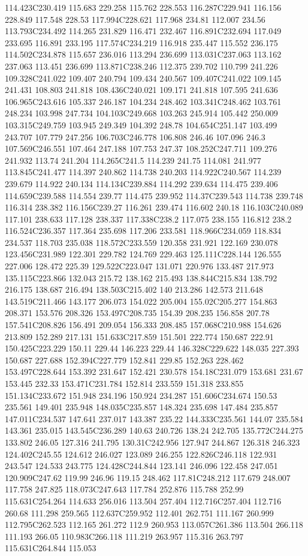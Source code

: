 114.423C230.419 115.683 229.258 115.762 228.553 116.287C229.941 116.156 228.849 117.548 228.53 117.994C228.621 117.968 234.81 112.007 234.56 113.793C234.492 114.265 231.829 116.471 232.467 116.891C232.694 117.049 233.695 116.891 233.195 117.574C234.219 116.918 235.447 115.552 236.175 114.502C234.878 115.657 236.016 113.294 236.699 113.031C237.063 113.162 237.063 113.451 236.699 113.871C238.246 112.375 239.702 110.799 241.226 109.328C241.022 109.407 240.794 109.434 240.567 109.407C241.022 109.145 241.431 108.803 241.818 108.436C240.021 109.171 241.818 107.595 241.636 106.965C243.616 105.337 246.187 104.234 248.462 103.341C248.462 103.761 248.234 103.998 247.734 104.103C249.668 103.263 245.914 105.442 250.009 103.315C249.759 103.945 249.349 104.392 248.78 104.654C251.147 103.499 243.707 107.779 247.256 106.703C246.778 106.808 246.46 107.096 246.3 107.569C246.551 107.464 247.188 107.753 247.37 108.252C247.711 109.276 241.932 113.74 241.204 114.265C241.5 114.239 241.75 114.081 241.977 113.845C241.477 114.397 240.862 114.738 240.203 114.922C240.567 114.239 239.679 114.922 240.134 114.134C239.884 114.292 239.634 114.475 239.406 114.659C239.588 114.554 239.77 114.475 239.952 114.37C239.543 114.738 239.748 116.314 238.382 116.156C239.27 116.261 239.474 116.602 240.18 116.103C240.089 117.101 238.633 117.128 238.337 117.338C238.2 117.075 238.155 116.812 238.2 116.524C236.357 117.364 235.698 117.206 233.581 118.966C234.059 118.834 234.537 118.703 235.038 118.572C233.559 120.358 231.921 122.169 230.078 123.456C231.989 122.301 229.782 124.769 229.463 125.111C228.144 126.555 227.006 128.472 225.39 129.522C223.047 131.071 220.976 133.487 217.973 135.115C223.866 132.043 215.72 138.162 215.493 138.844C215.834 138.792 216.175 138.687 216.494 138.503C215.402 140 213.286 142.573 211.648 143.519C211.466 143.177 206.073 154.022 205.004 155.02C205.277 154.863 208.371 153.576 208.326 153.497C208.735 154.39 208.235 156.858 207.78 157.541C208.826 156.491 209.054 156.333 208.485 157.068C210.988 154.626 213.809 152.289 217.131 151.633C217.859 151.501 222.774 150.687 222.91 150.425C223.229 150.11 229.44 146.223 229.44 146.328C229.622 148.035 227.393 150.687 227.688 152.394C227.779 152.841 229.85 152.263 228.462 153.497C228.644 153.392 231.647 152.421 230.578 154.18C231.079 153.681 231.67 153.445 232.33 153.471C231.784 152.814 233.559 151.318 233.855 151.134C233.672 151.948 234.196 150.924 234.287 151.606C234.674 150.53 235.561 149.401 235.948 148.035C235.857 148.324 235.698 147.484 235.857 147.011C234.537 147.641 237.017 143.387 235.22 144.333C235.561 144.07 235.584 143.361 235.015 143.545C236.289 140.63 240.726 138.24 242.705 135.772C244.275 133.802 246.05 127.316 241.795 130.31C242.956 127.947 244.867 126.318 246.323 124.402C245.55 124.612 246.027 123.089 246.255 122.826C246.118 122.931 243.547 124.533 243.775 124.428C244.844 123.141 246.096 122.458 247.051 120.909C247.62 119.99 246.96 119.15 248.462 117.81C248.212 117.679 248.007 117.758 247.825 118.073C247.643 117.784 252.876 115.788 252.99 115.631C254.264 114.633 256.016 113.504 257.404 112.716C257.404 112.716 260.68 111.298 259.565 112.637C259.952 112.401 262.751 111.167 260.999 112.795C262.523 112.165 261.272 112.9 260.953 113.057C261.386 113.504 266.118 111.193 266.05 110.983C266.118 111.219 263.957 115.316 263.797 115.631C264.844 115.053 